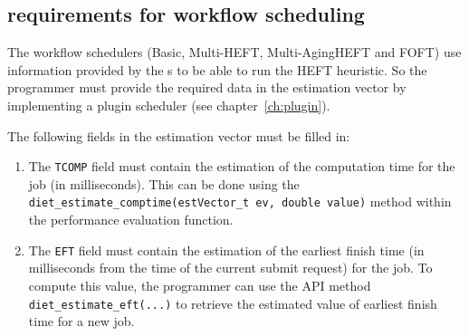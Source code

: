 \subsection{\sed requirements for workflow scheduling}

The workflow schedulers (Basic, Multi-HEFT, Multi-AgingHEFT and FOFT) use
information provided by the {\sed}s to be able to run the HEFT heuristic. So the
\sed programmer must provide the required data in the estimation vector by
implementing a plugin scheduler (see chapter~\ref{ch:plugin}).

The following fields in the estimation vector must be filled in:
\begin{enumerate}
\item The \texttt{TCOMP} field must contain the estimation of the
computation time for the job (in milliseconds). This can be done using the
\texttt{diet\_estimate\_comptime(estVector\_t ev, double value)} method
within the performance evaluation function.
\item The \texttt{EFT} field must contain the estimation of the
earliest finish time (in milliseconds from the time of the current submit
request) for the job. To compute this value, the \sed programmer can use
the API method \\
\texttt{diet\_estimate\_eft(...)} to retrieve the
estimated value of earliest finish time for a new job.
\end{enumerate}

